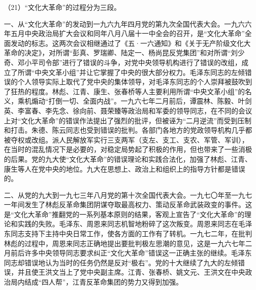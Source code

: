 （21）“文化大革命”的过程分为三段。

一、从“文化大革命”的发动到一九六九年四月党的第九次全国代表大会。一九六六年五月中央政治局扩大会议和同年八月八届十一中全会的召开，是“文化大革命”全面发动的标志。这两次会议相继通过了《五·一六通知》和《关于无产阶级文化大革命的决定》，对所谓“彭真、罗瑞卿、陆定一、杨尚昆反党集团”和对所谓“刘少奇、邓小平司令部”进行了错误的斗争，对党中央领导机构进行了错误的改组，成立了所谓“中央文革小组”并让它掌握了中央的很大部分权力。毛泽东同志的左倾错误的个人领导实际上取代了党中央的集体领导，对毛泽东同志的个人崇拜被鼓吹到了狂热的程度。林彪、江青、康生、张春桥等人主要利用所谓“中央文革小组”的名义，乘机煽动“打倒一切、全面内战”。一九六七年二月前后，谭震林、陈毅、叶剑英、李富春、李先念、徐向前、聂荣臻等政治局和军委的领导同志，在不同的会议上对“文化大革命”的错误作法提出了强烈的批评，但被诬为“二月逆流”而受到压制和打击。朱德、陈云同志也受到错误的批判。各部门各地方的党政领导机构几乎都被夺权或改组。派人民解放军实行三支两军（支左、支工、支农、军管、军训），在当时的混乱情况下是必要的，对稳定局势起了积极的作用，但也带来了一些消极的后果。党的九大使“文化大革命”的错误理论和实践合法化，加强了林彪、江青、康生等人在党中央的地位。九大在思想上、政治上和组织上的指导方针都是错误的。

二、从党的九大到一九七三年八月党的第十次全国代表大会。一九七〇年至一九七一年间发生了林彪反革命集团阴谋夺取最高权力、策动反革命武装政变的事件。这是“文化大革命”推翻党的一系列基本原则的结果，客观上宣告了“文化大革命”的理论和实践的失败。毛泽东、周恩来同志机智地粉碎了这次叛变。周恩来同志在毛泽东同志支持下主持中央日常工作，使各方面的工作有了转机。一九七二年，在批判林彪的过程中，周恩来同志正确地提出要批判极左思潮的意见，这是一九六七年二月前后许多中央领导同志要求纠正“文化大革命”错误这一正确主张的继续。毛泽东同志却错误地认为当时的任务仍然是反对“极右”。党的十大继续了九大的左倾错误，并且使王洪文当上了党中央副主席。江青、张春桥、姚文元、王洪文在中央政治局内结成“四人帮”，江青反革命集团的势力又得到加强。

